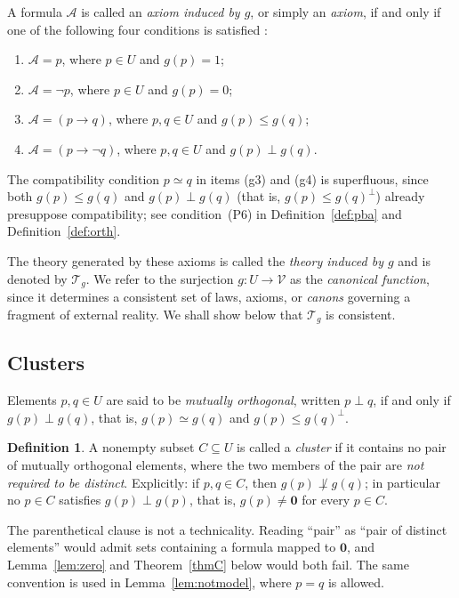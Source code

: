 \documentclass{article}   	%
\theoremstyle{plain}
\theoremstyle{definition}
\newtheorem{definition}[theorem]{Definition}
\theoremstyle{remark}
\begin{document}
A formula $\mathcal A$ is called an \emph{axiom induced by $g$}, or simply an \emph{axiom}, if and only if one of the following four conditions is satisfied \cite{mal2}:
\begin{enumerate}
\item[(g1)] $\mathcal A=p$, where $p\in U$ and $g(p)=1$;
\item[(g2)] $\mathcal A=\neg p$, where $p\in U$ and $g(p)=0$;
\item[(g3)] $\mathcal A=(p\to q)$, where $p,q\in U$ and $g(p)\le g(q)$;
\item[(g4)] $\mathcal A=(p\to\neg q)$, where $p,q\in U$ and $g(p)\perp g(q)$.
\end{enumerate}

The compatibility condition $p\simeq q$ in items (g3) and (g4) is superfluous, since both $g(p)\le g(q)$ and $g(p)\perp g(q)$ (that is, $g(p)\le g(q)^\perp$) already presuppose compatibility; see condition~\rm(P6) in Definition~\ref{def:pba} and Definition~\ref{def:orth}.

The theory generated by these axioms is called the \emph{theory induced by $g$} and is denoted by $\mathcal T_g$.
We refer to the surjection $g:U\to\mathcal V$ as the \emph{canonical function}, since it determines a consistent set of laws, axioms, or \emph{canons} governing a fragment of external reality.
We shall show below that $\mathcal T_g$ is consistent.

\subsection{Clusters}
\label{sec:clusters}

Elements $p,q\in U$ are said to be \emph{mutually orthogonal}, written $p\perp q$, if and only if
$g(p)\perp g(q)$, that is, $g(p)\simeq g(q)$ and $g(p)\le g(q)^\perp$.

\begin{definition}
\label{def:cluster}
A nonempty subset $C\subseteq U$ is called a \emph{cluster} if it contains no
pair of mutually orthogonal elements, where the two members of the pair are
\emph{not required to be distinct}.  Explicitly: if $p,q\in C$, then
$g(p)\not\perp g(q)$; in particular no $p\in C$ satisfies $g(p)\perp g(p)$,
that is, $g(p)\ne\mathbf 0$ for every $p\in C$.
\end{definition}

The parenthetical clause is not a technicality.  Reading ``pair'' as ``pair of
distinct elements'' would admit sets containing a formula mapped to
$\mathbf 0$, and Lemma~\ref{lem:zero} and Theorem~\ref{thmC} below would both
fail.  The same convention is used in Lemma~\ref{lem:notmodel}, where $p=q$ is
allowed.
\end{document}
